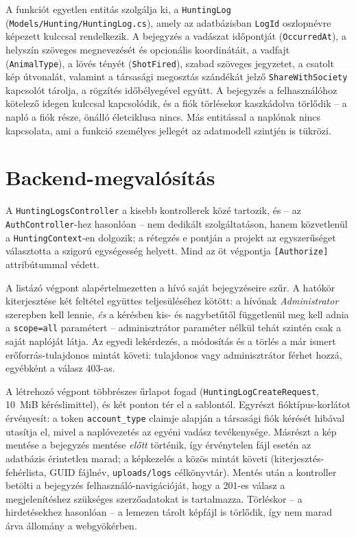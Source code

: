A funkciót egyetlen entitás szolgálja ki, a \texttt{HuntingLog}
(\texttt{Models/Hunting/HuntingLog.cs}), amely az adatbázisban \texttt{LogId} oszlopnévre képezett
kulccsal rendelkezik. A bejegyzés a vadászat időpontját (\texttt{OccurredAt}), a helyszín szöveges
megnevezését és opcionális koordinátáit, a vadfajt (\texttt{AnimalType}), a lövés tényét
(\texttt{ShotFired}), szabad szöveges jegyzetet, a csatolt kép útvonalát, valamint a társasági
megosztás szándékát jelző \texttt{ShareWithSociety} kapcsolót tárolja, a rögzítés időbélyegével
együtt. A bejegyzés a felhasználóhoz kötelező idegen kulccsal kapcsolódik, és a fiók törlésekor
kaszkádolva törlődik -- a napló a fiók része, önálló életciklusa nincs. Más entitással a
naplónak nincs kapcsolata, ami a funkció személyes jellegét az adatmodell szintjén is tükrözi.

\section{Backend-megvalósítás}
\label{sec:log-backend}

A \texttt{HuntingLogsController} a kisebb kontrollerek közé tartozik, és -- az
\texttt{AuthController}-hez hasonlóan -- nem dedikált szolgáltatáson, hanem közvetlenül a
\texttt{HuntingContext}-en dolgozik; a rétegzés e pontján a projekt az egyszerűséget választotta a
szigorú egységesség helyett. Mind az öt végpontja \texttt{[Authorize]} attribútummal védett.

A listázó végpont alapértelmezetten a hívó saját bejegyzéseire szűr. A hatókör kiterjesztése két
feltétel együttes teljesüléséhez kötött: a hívónak \emph{Administrator} szerepben kell lennie,
\emph{és} a kérésben kis- és nagybetűtől függetlenül meg kell adnia a \texttt{scope=all}
paramétert -- adminisztrátor paraméter nélkül tehát szintén csak a saját naplóját látja. Az
egyedi lekérdezés, a módosítás és a törlés a már ismert erőforrás-tulajdonos mintát követi:
tulajdonos vagy adminisztrátor férhet hozzá, egyébként a válasz 403-as.

A létrehozó végpont többrészes űrlapot fogad (\texttt{HuntingLogCreateRequest}, 10~MiB
kéréslimittel), és két ponton tér el a sablontól. Egyrészt fióktípus-korlátot érvényesít: a token
\texttt{account\_type} claimje alapján a társasági fiók kérését hibával utasítja el, mivel a
naplóvezetés az egyéni vadász tevékenysége. Másrészt a kép mentése a bejegyzés mentése
\emph{előtt} történik, így érvénytelen fájl esetén az adatbázis érintetlen marad; a képkezelés a
közös mintát követi (kiterjesztés-fehérlista, GUID fájlnév, \texttt{uploads/logs} célkönyvtár).
Mentés után a kontroller betölti a bejegyzés felhasználó-navigációját, hogy a 201-es válasz a
megjelenítéshez szükséges szerzőadatokat is tartalmazza. Törléskor -- a hirdetésekhez hasonlóan --
a lemezen tárolt képfájl is törlődik, így nem marad árva állomány a webgyökérben.

